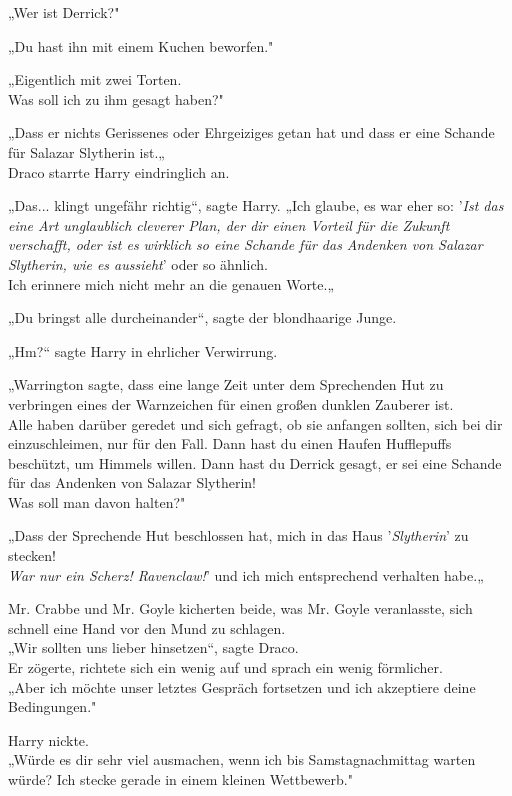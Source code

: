 {„Wer ist Derrick?"

„Du hast ihn mit einem Kuchen beworfen."

„Eigentlich mit zwei Torten.\\ Was soll ich zu ihm gesagt haben?"

„Dass er nichts Gerissenes oder Ehrgeiziges getan hat und dass er eine Schande für Salazar Slytherin ist.„\\ Draco starrte Harry eindringlich an.

„Das... klingt ungefähr richtig“, sagte Harry. „Ich glaube, es war eher so: '\emph{Ist das eine Art unglaublich cleverer Plan, der dir einen Vorteil für die Zukunft verschafft, oder ist es wirklich so eine Schande für das Andenken von Salazar Slytherin, wie es aussieht}' oder so ähnlich.\\ Ich erinnere mich nicht mehr an die genauen Worte.„

„Du bringst alle durcheinander“, sagte der blondhaarige Junge.

„Hm?“ sagte Harry in ehrlicher Verwirrung.

„Warrington sagte, dass eine lange Zeit unter dem Sprechenden Hut zu verbringen eines der Warnzeichen für einen großen dunklen Zauberer ist.\\ Alle haben darüber geredet und sich gefragt, ob sie anfangen sollten, sich bei dir einzuschleimen, nur für den Fall. Dann hast du einen Haufen Hufflepuffs beschützt, um Himmels willen. Dann hast du Derrick gesagt, er sei eine Schande für das Andenken von Salazar Slytherin!\\ Was soll man davon halten?"

„Dass der Sprechende Hut beschlossen hat, mich in das Haus '\emph{Slytherin}' zu stecken!\\ \emph{War nur ein Scherz! Ravenclaw!}' und ich mich entsprechend verhalten habe.„

Mr. Crabbe und Mr. Goyle kicherten beide, was Mr. Goyle veranlasste, sich schnell eine Hand vor den Mund zu schlagen.\\ „Wir sollten uns lieber hinsetzen“, sagte Draco.\\ Er zögerte, richtete sich ein wenig auf und sprach ein wenig förmlicher.\\ „Aber ich möchte unser letztes Gespräch fortsetzen und ich akzeptiere deine Bedingungen."

Harry nickte.\\ „Würde es dir sehr viel ausmachen, wenn ich bis Samstagnachmittag warten würde? Ich stecke gerade in einem kleinen Wettbewerb."

}
